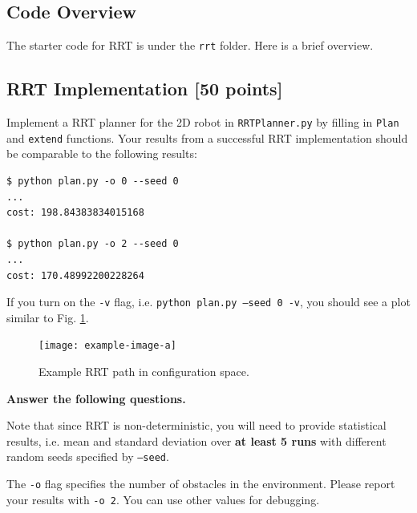\documentclass[tp]{lcc}
\begin{document}
\subsection{Code Overview}
The starter code for RRT is under the \texttt{rrt} folder. Here is a brief overview.

\subsection{RRT Implementation [50 points]}
Implement a RRT planner for the 2D robot in \texttt{RRTPlanner.py} by filling in \texttt{Plan} and \texttt{extend} functions. Your results from a successful RRT implementation should be comparable to the following results:

\begin{verbatim}
$ python plan.py -o 0 --seed 0
...
cost: 198.84383834015168

$ python plan.py -o 2 --seed 0
...
cost: 170.48992200228264
\end{verbatim}

If you turn on the \texttt{-v} flag, i.e. \texttt{python plan.py --seed 0 -v}, you should see a plot similar to Fig. \ref{fig:rrt}.

 \begin{figure}[h]
     \centering
     \texttt{[image: example-image-a]}
     \caption{Example RRT path in configuration space.}
     \label{fig:rrt}
 \end{figure}

\textbf{Answer the following questions.}

Note that since RRT is non-deterministic, you will need to provide statistical results, i.e. mean and standard deviation over \textbf{at least 5 runs} with different random seeds specified by \texttt{--seed}.

The \texttt{-o} flag specifies the number of obstacles in the environment. Please report your results with \texttt{-o 2}. You can use other values for debugging.
\end{document}
